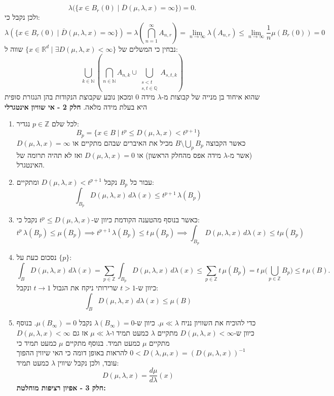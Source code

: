 \documentclass{tstextbook}
\begin{document}
$$\lambda\big(\{x\in B_{r}(0)\mid\overline{{{D}}}(\mu,\lambda,x)=\infty\}\big)=0.$$
ולכן נקבל כי:
$$ \lambda(\{x \in B_r(0) \mid \overline{D}(\mu, \lambda, x) = \infty\}) = \lambda\left( \bigcap_{n=1}^\infty A_{n,r} \right) = \lim_{n \to \infty} \lambda(A_{n,r}) \leq \lim_{n \to \infty} \frac{1}{n} \mu(B_r(0)) = 0 $$
נבחין כי המשלים של \(\{x \in \mathbb{R}^d \mid \exists D(\mu, \lambda, x) < \infty\}\) שווה ל:
$$ \bigcup_{k \in \mathbb{N}} \left( \bigcap_{n \in \mathbb{N}} A_{n,k} \cup \bigcup_{\substack{s < t \\ s,t \in \mathbb{Q}}} A_{s,t,k} \right) $$
שהוא איחוד בן מנייה של קבוצות מ-\(\lambda\) מידה 0 ומכאן נובע שקבוצת הנקודות בהן הנגזרת סופית היא בעלת מידה מלאה.
\textbf{חלק 2 - אי שוויון אינטגרלי}

\begin{enumerate}
  \item לכל שלם \(p \in \mathbb{Z}\) נגדיר: 
$$ B_p = \{x \in B \mid t^p \leq D(\mu, \lambda, x) < t^{p+1}\} $$
כאשר הקבוצה \(B \setminus \bigcup_{p}B_{p}\) מכיל את האיברים שבהם מתקיים או \(D\left( \mu,\lambda,x \right)=\infty\) (אשר מ-\(\lambda\) מידה אפס מהחלק הראשון) או \(D\left( \mu,\lambda,x \right)=0\) ואז לא תהיה תרומה של האינטגרל.


  \item עבור כל \(B_{p}\) נקבל \(D\left( \mu,\lambda,x \right)<t^{p+1}\) ומתקיים: 
$$\int_{B_{p}}D(\mu,\lambda,x)\,d\lambda(x)\leq t^{p+1}\,\lambda(B_{p})$$


  \item כאשר בנוסף מהטענה הקודמת כיוון ש-\(t^{p}\leq D\left( \mu,\lambda,x \right)\) נקבל כי: 
$$t^{p}\,\lambda(B_{p})\leq\mu(B_{p})\implies t^{p+1}\,\lambda(B_{p})\leq t\,\mu(B_{p})\implies \int_{B_{p}}D\left( \mu,\lambda,x \right)\,d\lambda(x)\leq t\mu(B_{p})$$


  \item נסכום כעת על \(\{ p \}\): 
$$\int_{B}D(\mu,\lambda,x)\,d\lambda(x)=\sum_{p\in\mathbb{Z}}\int_{B_{p}}D(\mu,\lambda,x)\,d\lambda(x)\leq\sum_{p\in\mathbb{Z}}t\,\mu(B_{p})=t\,\mu\Big(\bigcup_{p\in\mathbb{Z}}B_{p}\Big)\leq t\,\mu(B).$$
כיוון ש-\(t> 1\) שרירותי ניקח את הגבול \(t\to 1\) ונקבל:
$$\int_{B}D(\mu,\lambda,x)\,d\lambda(x)\leq\mu(B)$$


  \item כדי להוכיח את השוויון נניח \(\mu\ll \lambda\). כיוון ש-\(\lambda\left( B_{\infty} \right)=0\) נקבל \(\mu\left( B_{\infty} \right)=0\). בנוסף כיוון ש-\(D\left( \mu,\lambda,x \right)<\infty\) מתקיים \(\lambda\) כמעט תמיד ו-\(\mu\ll \lambda\) אז גם \(D\left( \mu,\lambda,x \right)<\infty\) מתקיים \(\mu\) כמעט תמיד. בנוסף מתקיים \(\mu\) כמעט תמיד כי \(0 < D(\lambda, \mu, x) = (D(\mu, \lambda, x))^{-1}\) להראות באופן דומה כי האי שיווין ההפוך עובד, ולכן נקבל שיווין \(\lambda\) כמעט תמיד: 
$$D(\mu,\lambda,x)=\frac{d\mu}{d\lambda}(x)$$\textbf{חלק 3 - אפיון רציפות מוחלטת:}



\end{enumerate}
\end{document}
